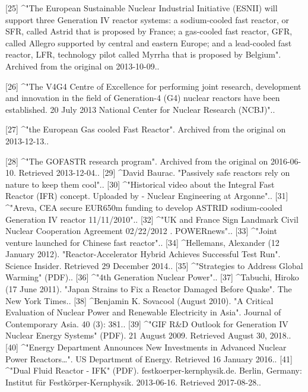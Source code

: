 [25]
^"The European Sustainable Nuclear Industrial Initiative (ESNII) will support three Generation IV reactor systems: a sodium-cooled fast reactor, or SFR, called Astrid that is proposed by France; a gas-cooled fast reactor, GFR, called Allegro supported by central and eastern Europe; and a lead-cooled fast reactor, LFR, technology pilot called Myrrha that is proposed by Belgium". Archived from the original on 2013-10-09..

[26]
^"The V4G4 Centre of Excellence for performing joint research, development and innovation in the field of Generation-4 (G4) nuclear reactors have been established. 20 July 2013 National Center for Nuclear Research (NCBJ)"..

[27]
^"the European Gas cooled Fast Reactor". Archived from the original on 2013-12-13..

[28]
^"The GOFASTR research program". Archived from the original on 2016-06-10. Retrieved 2013-12-04..
[29]
^David Baurac. "Passively safe reactors rely on nature to keep them cool"..
[30]
^"Historical video about the Integral Fast Reactor (IFR) concept. Uploaded by - Nuclear Engineering at Argonne"..
[31]
^"Areva, CEA secure EUR650m funding to develop ASTRID sodium-cooled Generation IV reactor 11/11/2010"..
[32]
^"UK and France Sign Landmark Civil Nuclear Cooperation Agreement 02/22/2012 . POWERnews"..
[33]
^"Joint venture launched for Chinese fast reactor"..
[34]
^Hellemans, Alexander (12 January 2012). "Reactor-Accelerator Hybrid Achieves Successful Test Run". Science Insider. Retrieved 29 December 2014..
[35]
^"Strategies to Address Global Warming" (PDF)..
[36]
^"4th Generation Nuclear Power"..
[37]
^Tabuchi, Hiroko (17 June 2011). "Japan Strains to Fix a Reactor Damaged Before Quake". The New York Times..
[38]
^Benjamin K. Sovacool (August 2010). "A Critical Evaluation of Nuclear Power and Renewable Electricity in Asia". Journal of Contemporary Asia. 40 (3): 381..
[39]
^"GIF R&D Outlook for Generation IV Nuclear Energy Systems" (PDF). 21 August 2009. Retrieved August 30, 2018..
[40]
^"Energy Department Announces New Investments in Advanced Nuclear Power Reactors…". US Department of Energy. Retrieved 16 January 2016..
[41]
^"Dual Fluid Reactor - IFK" (PDF). festkoerper-kernphysik.de. Berlin, Germany: Institut für Festkörper-Kernphysik. 2013-06-16. Retrieved 2017-08-28..